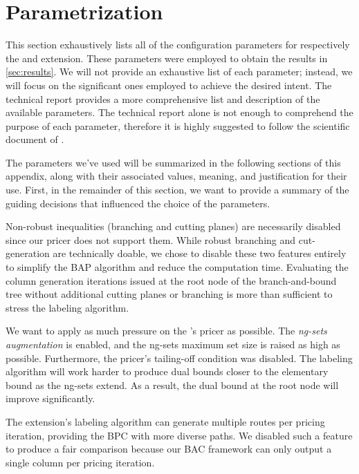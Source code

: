\chapter{\bapcod{} Parametrization}
\label{sec:bapcod-appendix}

This section exhaustively lists all of the configuration parameters
for respectively the \bapcod{} and \vrpsolver{} extension.
These parameters were employed to obtain the results in \cref{sec:results}.
We will not provide an exhaustive list of each parameter;
instead, we will focus on the significant ones employed to achieve the desired intent.
The \bapcod{} technical report \parencite{sadykov2021}
provides a more comprehensive list and description of the available parameters.
The technical report alone is not enough to comprehend the purpose of each parameter,
therefore it is highly suggested to follow the scientific document of \textcite{pessoa2020generic}.

\medskip

The parameters we've used will be summarized in the following sections of this appendix,
along with their associated values, meaning, and justification for their use.
First, in the remainder of this section,
we want to provide a summary of the guiding decisions
that influenced the choice of the parameters.

Non-robust inequalities (branching and cutting planes)
are necessarily disabled since our pricer does not support them.
While robust branching and cut-generation are technically doable,
we chose to disable these two features entirely to simplify the BAP algorithm
and reduce the computation time.
Evaluating the column generation iterations issued at the root node
of the branch-and-bound tree without additional cutting planes or branching
is more than sufficient to stress the labeling algorithm.

We want to apply as much pressure on the \vrpsolver{}'s pricer as possible.
The \textit{ng-sets augmentation} \parencite{pessoa2020generic} is enabled,
and the ng-sets maximum set size is raised as high as possible.
Furthermore, the \vrpsolver{} pricer's tailing-off condition was disabled.
The labeling algorithm will work harder to produce dual bounds closer to the elementary bound
as the ng-sets extend.
As a result, the dual bound at the root node will improve significantly.

The \vrpsolver{} extension's labeling algorithm can generate multiple routes
per pricing iteration, providing the BPC with more diverse paths.
We disabled such a feature to produce a fair comparison because our BAC framework
can only output a single column per pricing iteration.

